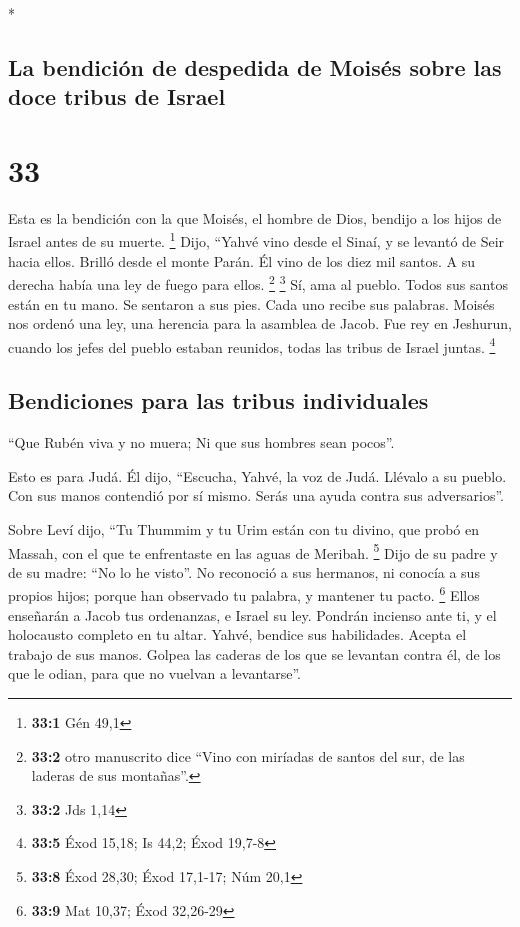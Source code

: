\begin{paracol}{2}
\begin{otherlanguage}{english}
\end{otherlanguage}

\switchcolumn[0]*

\hypertarget{la-bendiciuxf3n-de-despedida-de-moisuxe9s-sobre-las-doce-tribus-de-israel}{%
\subsection{La bendición de despedida de Moisés sobre las doce tribus de
Israel}\label{la-bendiciuxf3n-de-despedida-de-moisuxe9s-sobre-las-doce-tribus-de-israel}}

\hypertarget{section-64}{%
\section{33}\label{section-64}}

 Esta es la bendición con la que Moisés, el hombre de
Dios, bendijo a los hijos de Israel antes de su muerte. \footnote{\textbf{33:1}
  Gén 49,1}  Dijo, ``Yahvé vino desde el Sinaí, y se
levantó de Seir hacia ellos. Brilló desde el monte Parán. Él vino de los
diez mil santos. A su derecha había una ley de fuego para ellos.
\footnote{\textbf{33:2} otro manuscrito dice ``Vino con miríadas de
  santos del sur, de las laderas de sus montañas''.} \footnote{\textbf{33:2}
  Jds 1,14}  Sí, ama al pueblo. Todos sus santos están en
tu mano. Se sentaron a sus pies. Cada uno recibe sus palabras.
 Moisés nos ordenó una ley, una herencia para la asamblea
de Jacob.  Fue rey en Jeshurun, cuando los jefes del
pueblo estaban reunidos, todas las tribus de Israel juntas. \footnote{\textbf{33:5}
  Éxod 15,18; Is 44,2; Éxod 19,7-8}

\hypertarget{bendiciones-para-las-tribus-individuales}{%
\subsection{Bendiciones para las tribus
individuales}\label{bendiciones-para-las-tribus-individuales}}

 ``Que Rubén viva y no muera; Ni que sus hombres sean
pocos''.

 Esto es para Judá. Él dijo, ``Escucha, Yahvé, la voz de
Judá. Llévalo a su pueblo. Con sus manos contendió por sí mismo. Serás
una ayuda contra sus adversarios''.

 Sobre Leví dijo, ``Tu Thummim y tu Urim están con tu
divino, que probó en Massah, con el que te enfrentaste en las aguas de
Meribah. \footnote{\textbf{33:8} Éxod 28,30; Éxod 17,1-17; Núm 20,1}
 Dijo de su padre y de su madre: ``No lo he visto''. No
reconoció a sus hermanos, ni conocía a sus propios hijos; porque han
observado tu palabra, y mantener tu pacto. \footnote{\textbf{33:9} Mat
  10,37; Éxod 32,26-29}  Ellos enseñarán a Jacob tus
ordenanzas, e Israel su ley. Pondrán incienso ante ti, y el holocausto
completo en tu altar.  Yahvé, bendice sus habilidades.
Acepta el trabajo de sus manos. Golpea las caderas de los que se
levantan contra él, de los que le odian, para que no vuelvan a
levantarse''.


\end{paracol}
